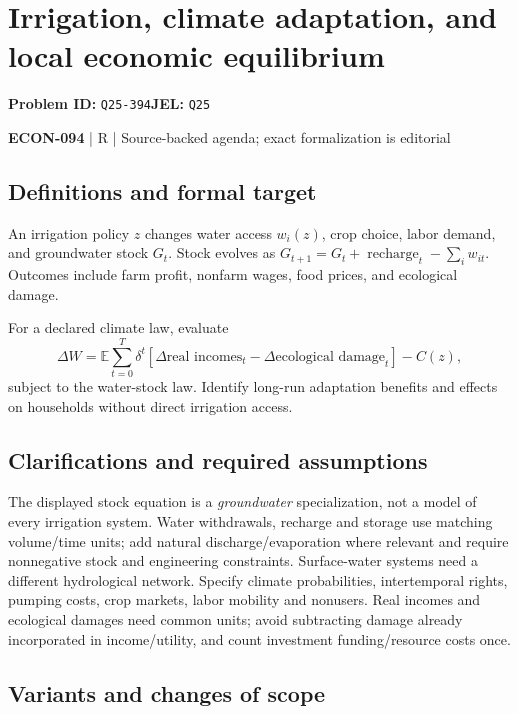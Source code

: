 \documentclass[11pt,a4paper]{article}
\begin{document}
\section*{Irrigation, climate adaptation, and local economic equilibrium}
\textbf{Problem ID:} \texttt{Q25-394}\quad \textbf{JEL:} \texttt{Q25}\par
\label{problem:OP-0652}


\label{audited:ECON-094}

{\sffamily\small\color{muted}\textbf{ECON-094} | R | Source-backed agenda; exact formalization is editorial\par}

\subsection*{Definitions and formal target}

An irrigation policy $z$ changes water access $w_i(z)$, crop choice, labor demand, and groundwater stock $G_t$. Stock evolves as $G_{t+1}=G_t+\operatorname{recharge}_t-\sum_iw_{it}$. Outcomes include farm profit, nonfarm wages, food prices, and ecological damage.

For a declared climate law, evaluate
\[
 \Delta W=\mathbb E\sum_{t=0}^{T}\delta^t
 [\Delta\text{real incomes}_t-\Delta\text{ecological damage}_t]-C(z),
\]
subject to the water-stock law. Identify long-run adaptation benefits and effects on households without direct irrigation access.

\subsection*{Clarifications and required assumptions}

The displayed stock equation is a \emph{groundwater} specialization, not a model of every irrigation system. Water withdrawals, recharge and storage use matching volume/time units; add natural discharge/evaporation where relevant and require nonnegative stock and engineering constraints. Surface-water systems need a different hydrological network. Specify climate probabilities, intertemporal rights, pumping costs, crop markets, labor mobility and nonusers. Real incomes and ecological damages need common units; avoid subtracting damage already incorporated in income/utility, and count investment funding/resource costs once.

\subsection*{Variants and changes of scope}
\end{document}
